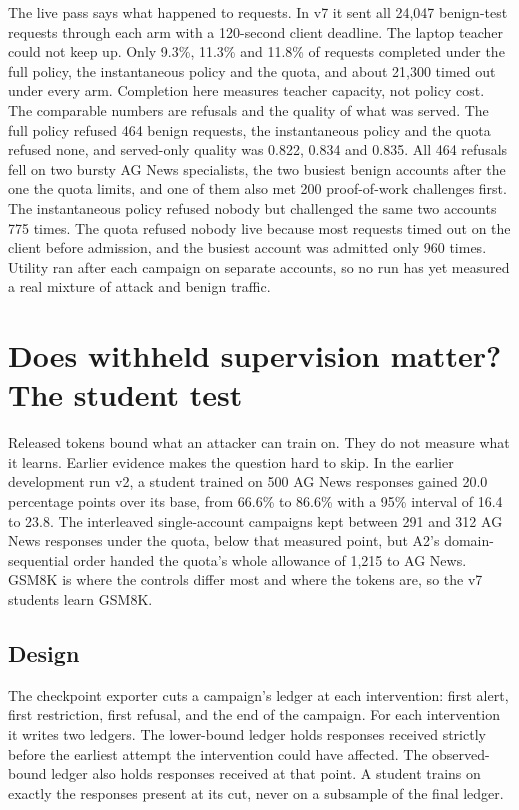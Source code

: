 \documentclass[journal]{IEEEtran}
\begin{document}
The live pass says what happened to requests. In v7 it sent all 24,047 benign-test requests through each arm with a 120-second client deadline. The laptop teacher could not keep up. Only 9.3\%, 11.3\% and 11.8\% of requests completed under the full policy, the instantaneous policy and the quota, and about 21,300 timed out under every arm. Completion here measures teacher capacity, not policy cost. The comparable numbers are refusals and the quality of what was served. The full policy refused 464 benign requests, the instantaneous policy and the quota refused none, and served-only quality was 0.822, 0.834 and 0.835. All 464 refusals fell on two bursty AG News specialists, the two busiest benign accounts after the one the quota limits, and one of them also met 200 proof-of-work challenges first. The instantaneous policy refused nobody but challenged the same two accounts 775 times. The quota refused nobody live because most requests timed out on the client before admission, and the busiest account was admitted only 960 times. Utility ran after each campaign on separate accounts, so no run has yet measured a real mixture of attack and benign traffic.

\section{Does withheld supervision matter? The student test}
\label{sec:students}
Released tokens bound what an attacker can train on. They do not measure what it learns. Earlier evidence makes the question hard to skip. In the earlier development run v2, a student trained on 500 AG News responses gained 20.0 percentage points over its base, from 66.6\% to 86.6\% with a 95\% interval of 16.4 to 23.8. The interleaved single-account campaigns kept between 291 and 312 AG News responses under the quota, below that measured point, but A2's domain-sequential order handed the quota's whole allowance of 1,215 to AG News. GSM8K is where the controls differ most and where the tokens are, so the v7 students learn GSM8K.

\subsection{Design}
The checkpoint exporter cuts a campaign's ledger at each intervention: first alert, first restriction, first refusal, and the end of the campaign. For each intervention it writes two ledgers. The lower-bound ledger holds responses received strictly before the earliest attempt the intervention could have affected. The observed-bound ledger also holds responses received at that point. A student trains on exactly the responses present at its cut, never on a subsample of the final ledger.
\end{document}
